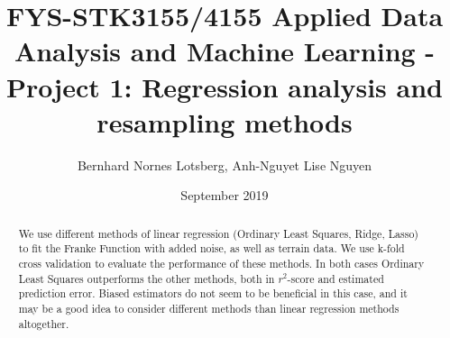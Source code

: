\documentclass[a4paper, 10pt]{article}
\title{FYS-STK3155/4155 Applied Data Analysis and Machine Learning - Project 1: Regression analysis and resampling methods }
\author{Bernhard Nornes Lotsberg, Anh-Nguyet Lise Nguyen}
\date{September 2019}
\begin{document}
\maketitle


\begin{abstract} \noindent
    We use different methods of linear regression (Ordinary Least Squares, Ridge, Lasso) to fit the Franke Function with added noise, as well as terrain data. We use k-fold cross validation to evaluate the performance of these methods. In both cases Ordinary Least Squares outperforms the other methods, both in $r^2$-score and estimated prediction error. Biased estimators do not seem to be beneficial in this case, and it may be a good idea to consider different methods than linear regression methods altogether.
\end{abstract}
\end{document}
